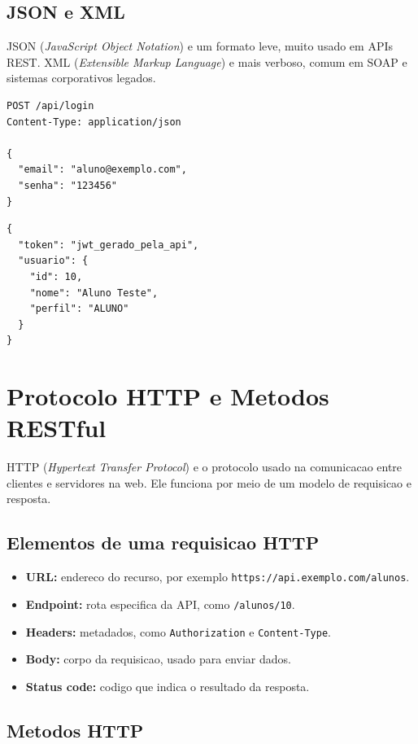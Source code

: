 \documentclass[12pt,a4paper]{article}
\begin{document}
\subsection{JSON e XML}

JSON (\textit{JavaScript Object Notation}) e um formato leve, muito usado em APIs REST. XML (\textit{Extensible Markup Language}) e mais verboso, comum em SOAP e sistemas corporativos legados.

\begin{lstlisting}[caption={Exemplo de requisicao JSON para login}]
POST /api/login
Content-Type: application/json

{
  "email": "aluno@exemplo.com",
  "senha": "123456"
}
\end{lstlisting}

\begin{lstlisting}[caption={Exemplo de resposta JSON}]
{
  "token": "jwt_gerado_pela_api",
  "usuario": {
    "id": 10,
    "nome": "Aluno Teste",
    "perfil": "ALUNO"
  }
}
\end{lstlisting}

\section{Protocolo HTTP e Metodos RESTful}

HTTP (\textit{Hypertext Transfer Protocol}) e o protocolo usado na comunicacao entre clientes e servidores na web. Ele funciona por meio de um modelo de requisicao e resposta.

\subsection{Elementos de uma requisicao HTTP}

\begin{itemize}
  \item \textbf{URL:} endereco do recurso, por exemplo \texttt{https://api.exemplo.com/alunos}.
  \item \textbf{Endpoint:} rota especifica da API, como \texttt{/alunos/10}.
  \item \textbf{Headers:} metadados, como \texttt{Authorization} e \texttt{Content-Type}.
  \item \textbf{Body:} corpo da requisicao, usado para enviar dados.
  \item \textbf{Status code:} codigo que indica o resultado da resposta.
\end{itemize}

\subsection{Metodos HTTP}
\end{document}
